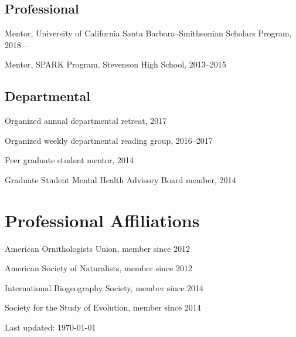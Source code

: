 \documentclass[letterpaper]{article}
\def\footerlink{}
\renewenvironment{itemize}{
  \begin{list}{}{
    \setlength{\leftmargin}{1.5em}
  }
}{
  \end{list}
}
\newenvironment{biblist}{%
   \begin{list}{}{%
     \setlength{\labelwidth}{0pt}%
     \setlength{\labelsep}{1em}%
     \setlength{\leftmargin}{2em}%
     \setlength{\itemindent}{-1em}%
   }
}{\end{list}}
\begin{document}
\subsection*{Professional}
\begin{biblist}
\item Mentor, University of California Santa Barbara--Smithsonian Scholars Program, 2018 --
\item Mentor, SPARK Program, Stevenson High School, 2013--2015
\end{biblist}
\subsection*{Departmental}
\begin{biblist}
\item Organized annual departmental retreat, 2017
\item Organized weekly departmental reading group, 2016--2017
\item Peer graduate student mentor, 2014
\item Graduate Student Mental Health Advisory Board member, 2014
\end{biblist}



\section*{Professional Affiliations}
\begin{itemize}
\item American Ornithologists Union, member since 2012
\item American Society of Naturalists, member since 2012
\item International Biogeography Society, member since 2014
\item Society for the Study of Evolution, member since 2014 
\end{itemize}


\bigskip

\begin{center}
  \begin{footnotesize}
    Last updated: \today \\
    \href{\footerlink}{\texttt{\footerlink}}
  \end{footnotesize}
\end{center}
\end{document}
